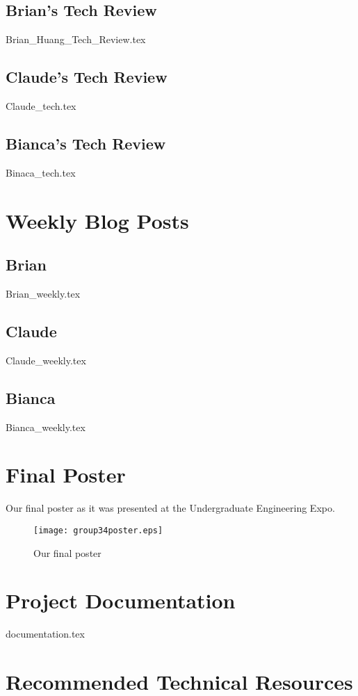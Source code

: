 \documentclass[onecolumn, draftclsnofoot,10pt, compsoc]{IEEEtran}
\begin{document}
	\subsection{Brian's Tech Review}
	{Brian_Huang_Tech_Review.tex}
	\subsection{Claude's Tech Review}
	{Claude_tech.tex}
	\subsection{Bianca's Tech Review}
	{Binaca_tech.tex}
	
	\section{Weekly Blog Posts}
	
	\subsection{Brian}
	{Brian_weekly.tex}
	
	\subsection{Claude}
	{Claude_weekly.tex}
	
	\subsection{Bianca}
	{Bianca_weekly.tex}
	\newpage
	\section{Final Poster}	
		Our final poster as it was presented at the Undergraduate Engineering Expo. 	
		\begin{figure}[!hb]
			\centering
			\texttt{[image: group34poster.eps]}
			\caption{Our final poster}
		\end{figure}

	\section{Project Documentation}
	{documentation.tex}
	
	\section{Recommended Technical Resources}
\end{document}
